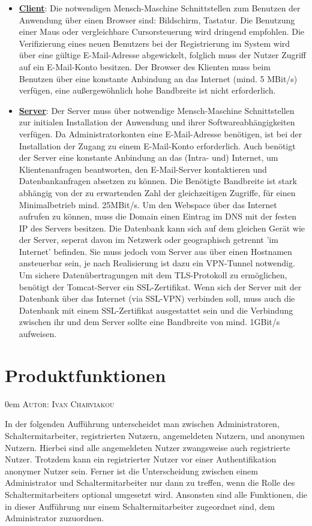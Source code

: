 \documentclass{article}
\makeatletter
\newcommand{\sectionauthor}[1]{
	{\parindent 0em \large \scshape Autor: #1 \par \nobreak \vspace*{2em}}
	\@afterheading
}
\makeatother
\begin{document}
\begin{itemize}
\item \underline{\textbf{Client}}: \linebreak
Die notwendigen Mensch-Maschine Schnittstellen zum Benutzen der Anwendung über einen Browser sind: Bildschirm, Tastatur. Die Benutzung einer Maus oder vergleichbare Cursorsteuerung wird dringend empfohlen. Die Verifizierung eines neuen Benutzers bei der Registrierung im System wird über eine gültige E-Mail-Adresse abgewickelt, folglich muss der Nutzer Zugriff auf ein E-Mail-Konto besitzen. Der Browser des Klienten muss beim Benutzen über eine konstante Anbindung an das Internet (mind. 5 MBit/s) verfügen, eine außergewöhnlich hohe Bandbreite ist nicht erforderlich.
\item \underline{\textbf{Server}}: \linebreak
Der Server muss über notwendige Mensch-Maschine Schnittstellen zur initialen Installation der Anwendung und ihrer Softwareabhängigkeiten verfügen. Da Administratorkonten eine E-Mail-Adresse benötigen, ist bei der Installation der Zugang zu einem E-Mail-Konto erforderlich. Auch benötigt der Server eine konstante Anbindung an das (Intra- und) Internet, um Klientenanfragen beantworten, den E-Mail-Server kontaktieren und Datenbankanfragen absetzen zu können. Die Benötigte Bandbreite ist stark abhängig von der zu erwartenden Zahl der gleichzeitigen Zugriffe, für einen Minimalbetrieb mind. 25MBit/s. Um den Webspace über das Internet aufrufen zu können, muss die Domain einen Eintrag im DNS mit der festen IP des Servers besitzen. Die Datenbank kann sich auf dem gleichen Gerät wie der Server, seperat davon im Netzwerk oder geographisch getrennt 'im Internet'  befinden. Sie muss jedoch vom Server aus über einen Hostnamen ansteuerbar sein, je nach Realisierung ist dazu ein VPN-Tunnel notwendig. Um sichere Datenübertragungen mit dem TLS-Protokoll zu ermöglichen, benötigt der Tomcat-Server ein SSL-Zertifikat. Wenn sich der Server mit der Datenbank über das Internet (via SSL-VPN) verbinden soll, muss auch die Datenbank mit einem SSL-Zertifikat ausgestattet sein und die Verbindung zwischen ihr und dem Server sollte eine Bandbreite von mind. 1GBit/s aufweisen. 
\end{itemize}

\newpage

\section{Produktfunktionen} %
\sectionauthor{Ivan Charviakou}
In der folgenden Aufführung unterscheidet man zwischen Administratoren, Schaltermitarbeiter, registrierten Nutzern, angemeldeten Nutzern, und anonymen Nutzern.
Hierbei sind alle angemeldeten Nutzer zwangsweise auch registrierte Nutzer. Trotzdem kann ein registrierter Nutzer vor einer Authentifikation anonymer Nutzer sein.
Ferner ist die Unterscheidung zwischen einem Administrator und Schaltermitarbeiter nur dann zu treffen, wenn die Rolle des Schaltermitarbeiters optional umgesetzt wird.
Ansonsten sind alle Funktionen, die in dieser Aufführung nur einem Schaltermitarbeiter zugeordnet sind, dem Administrator zuzuordnen.
\end{document}
